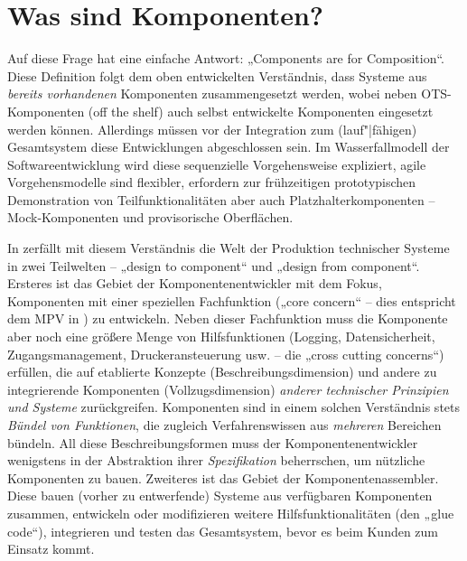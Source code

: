 \documentclass[11pt,a4paper]{article}
\begin{document}
\section{Was sind Komponenten?}

Auf diese Frage hat \cite{Szyperski2002} eine einfache Antwort: „Components
are for Composition“.  Diese Definition folgt dem oben entwickelten
Verständnis, dass Systeme aus \emph{bereits vorhandenen} Komponenten
zusammengesetzt werden, wobei neben OTS-Komponenten (off the shelf) auch
selbst entwickelte Komponenten eingesetzt werden können. Allerdings müssen vor
der Integration zum (lauf"|fähigen) Gesamtsystem diese Entwicklungen
abgeschlossen sein. Im Wasserfallmodell der Softwareentwicklung wird diese
sequenzielle Vorgehensweise expliziert, agile Vorgehensmodelle sind flexibler,
erfordern zur frühzeitigen prototypischen Demonstration von
Teilfunktionalitäten aber auch Platzhalterkomponenten -- Mock-Komponenten und
provisorische Oberflächen.

In \cite{Szyperski2002} zerfällt mit diesem Verständnis die Welt der
Produktion technischer Systeme in zwei Teilwelten -- „design to component“ und
„design from component“. Ersteres ist das Gebiet der Komponentenentwickler mit
dem Fokus, Komponenten mit einer speziellen Fachfunktion („core concern“ --
dies entspricht dem MPV in \cite{TESE2018}) zu entwickeln. Neben dieser
Fachfunktion muss die Komponente aber noch eine größere Menge von
Hilfsfunktionen (Logging, Datensicherheit, Zugangsmanagement,
Druckeransteuerung usw. -- die „cross cutting concerns“) erfüllen, die auf
etablierte Konzepte (Beschreibungsdimension) und andere zu integrierende
Komponenten (Vollzugsdimension) \emph{anderer technischer Prinzipien und
  Systeme} zurückgreifen.  Komponenten sind in einem solchen Verständnis stets
\emph{Bündel von Funktionen}, die zugleich Verfahrenswissen aus
\emph{mehreren} Bereichen bündeln.  All diese Beschreibungsformen muss der
Komponentenentwickler wenigstens in der Abstraktion ihrer \emph{Spezifikation}
beherrschen, um nützliche Komponenten zu bauen.  Zweiteres ist das Gebiet der
Komponentenassembler. Diese bauen (vorher zu entwerfende) Systeme aus
verfügbaren Komponenten zusammen, entwickeln oder modifizieren weitere
Hilfsfunktionalitäten (den „glue code“), integrieren und testen das
Gesamtsystem, bevor es beim Kunden zum Einsatz kommt.
\end{document}
